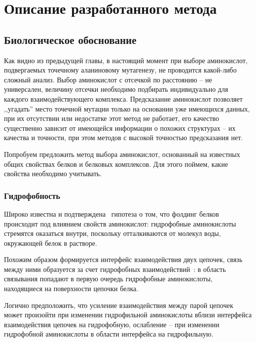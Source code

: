\graphicspath{{../images/algorithm/}}
\chapter{Описание разработанного метода}

\section{Биологическое обоснование}
Как видно из предыдущей главы,  в настоящий момент при выборе аминокислот, подвергаемых точечному аланиновому мутагенезу, не проводится какой-либо сложный анализ. Выбор аминокислот с отсечкой по расстоянию -- не универсален, величину отсечки необходимо подбирать индивидуально для каждого взаимодействующего комплекса. Предсказание аминокислот позволяет ,,угадать'' место точечной мутации только на основании уже имеющихся данных, при их отсутствии или недостатке этот метод не работает, его качество существенно зависит от имеющейся информации о похожих структурах -- их качества и точности, при этом методов с высокой точностью предсказания нет. 

Попробуем предложить метод выбора аминокислот, основанный на известных общих свойствах белков и белковых комплексов. Для этого поймем, какие свойства необходимо учитывать.


\subsection{Гидрофобность}
Широко известна и подтверждена~\cite{hydrophobic} гипотеза о том, что фолдинг белков происходит под влиянием свойств аминокислот: гидрофобные аминокислоты стремятся оказаться внутри, поскольку отталкиваются от молекул воды, окружающей белок в растворе.

Похожим образом формируется интерфейс взаимодействия двух цепочек, связь между ними образуется за счет гидрофобных взаимодействий~\cite{hydrophobic2chain}: в область связывания попадают в первую очередь гидрофобные аминокислоты, находящиеся на поверхности цепочки белка.

Логично предположить, что усиление взаимодействия между парой цепочек может произойти при изменении гидрофильной аминокислоты вблизи интерфейса взаимодействия цепочек на гидрофобную, ослабление -- при изменении гидрофобной аминокислоты в области интерфейса на гидрофильную.

